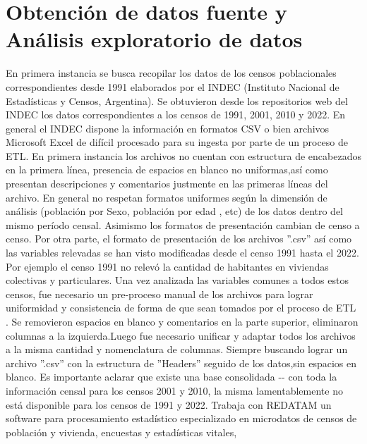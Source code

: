 \documentclass{article}
\theoremstyle{mytheoremstyle}
\theoremstyle{mytheoremstyle}
\theoremstyle{myproblemstyle}
\begin{document}
\section{Obtención de datos fuente y Análisis exploratorio de datos }
 En primera instancia se busca recopilar los datos de los censos poblacionales 
 correspondientes desde 1991 elaborados por el INDEC (Instituto Nacional de Estadísticas y Censos, Argentina). 
Se obtuvieron desde los repositorios web del INDEC los datos correspondientes a
 los censos de  1991, 2001, 2010 y 2022.
En general el INDEC dispone la información en formatos CSV o 
 bien archivos Microsoft Excel de difícil procesado para su ingesta por parte de un  proceso de ETL.\newline
  En primera instancia los archivos no cuentan con estructura de encabezados en la primera línea, presencia de 
 espacios en blanco no uniformas,así como presentan descripciones y comentarios justmente en las primeras líneas del archivo.
  En general no respetan formatos uniformes según la dimensión de análisis (población por Sexo, población por edad , etc) 
de los datos dentro del mismo período censal. Asimismo los formatos de presentación cambian de censo a censo.
Por otra parte, el formato de presentación de los  archivos ''.csv'' así como  las variables relevadas se han 
visto modificadas desde el censo 1991 hasta el 2022. Por ejemplo el censo 1991 no relevó la cantidad de habitantes
en viviendas colectivas y particulares.\newline
Una vez analizada las variables comunes a todos estos censos, fue necesario un pre-proceso manual
 de los archivos para lograr uniformidad y consistencia de forma de que sean tomados por el proceso de ETL . Se removieron espacios en blanco y comentarios
en la parte superior, eliminaron columnas a la izquierda.Luego fue necesario unificar y adaptar todos los archivos a la misma
 cantidad y nomenclatura de columnas.
Siempre buscando lograr un archivo ''.csv'' con la estructura de ''Headers'' seguido de los datos,sin espacios en blanco.\newline
Es importante aclarar que existe una base consolidada -- con toda la información censal para los censos 2001 y 2010,
 la misma lamentablemente no está disponible para los censos de 1991 y 2022. Trabaja con REDATAM  un software para procesamiento estadístico 
 especializado en microdatos de  censos de población y vivienda, encuestas y estadísticas vitales,
\end{document}
